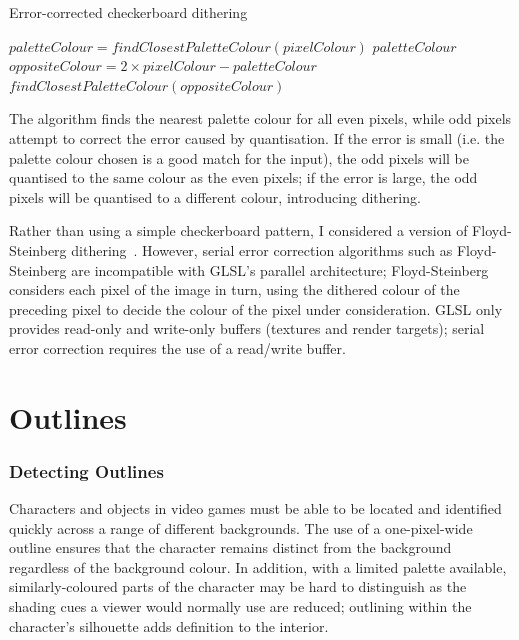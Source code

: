 \documentclass[12pt,twoside,notitlepage]{report}
\begin{document}
\begin{algorithm}
\caption{Error-corrected checkerboard dithering}
\begin{algorithmic}[1]
\State$paletteColour = findClosestPaletteColour(pixelColour)$
	\State\Return$paletteColour$
\Else
	\State$oppositeColour = 2 \times pixelColour - paletteColour$
	\State\Return$findClosestPaletteColour(oppositeColour)$
\EndIf
\end{algorithmic}
\end{algorithm}

The algorithm finds the nearest palette colour for all even pixels, while odd pixels attempt to correct the error caused by quantisation. If the error is small (i.e. the palette colour chosen is a good match for the input), the odd pixels will be quantised to the same colour as the even pixels; if the error is large, the odd pixels will be quantised to a different colour, introducing dithering.

Rather than using a simple checkerboard pattern, I considered a version of Floyd-Steinberg dithering~\cite{Floyd:1976:AAS}. However, serial error correction algorithms such as Floyd-Steinberg are incompatible with GLSL's parallel architecture; Floyd-Steinberg considers each pixel of the image in turn, using the dithered colour of the preceding pixel to decide the colour of the pixel under consideration. GLSL only provides read-only and write-only buffers (textures and render targets); serial error correction requires the use of a read/write buffer.

\section{Outlines}
\label{subsec:outlines}

\subsubsection{Detecting Outlines}

Characters and objects in video games must be able to be located and identified quickly across a range of different backgrounds. The use of a one-pixel-wide outline ensures that the character remains distinct from the background regardless of the background colour. In addition, with a limited palette available, similarly-coloured parts of the character may be hard to distinguish as the shading cues a viewer would normally use are reduced; outlining within the character's silhouette adds definition to the interior.
\end{document}

